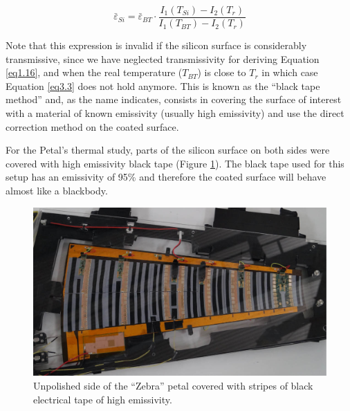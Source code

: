 		\begin{equation}\label{eq3.3}
			\bar{\varepsilon}_{Si} = \bar{\varepsilon}_{BT} \cdot \frac{I_{1}(T_{Si}) - I_{2}(T_{r})}{I_{1}(T_{BT}) - I_{2}(T_{r})}
		\end{equation}\bigskip
	
		Note that this expression is invalid if the silicon surface is considerably transmissive, since we have neglected transmissivity for deriving Equation \ref{eq1.16}, and when the real temperature ($T_{BT}$) is close to $T_{r}$ in which case Equation \ref{eq3.3} does not hold anymore. This is known as the “black tape method” and, as the name indicates, consists in covering the surface of interest with a material of known emissivity (usually high emissivity) and use the direct correction method on the coated surface.
		
		For the Petal’s thermal study, parts of the silicon surface on both sides were covered with high emissivity black tape (Figure \ref{fig3.2}). The black tape used for this setup has an emissivity of 95\% and therefore the coated surface will behave almost like a blackbody. 
	
		\begin{figure}[ht!]
			\centering
			\captionsetup{justification=centering,margin=2cm}
			\includegraphics[scale=0.40]{Figures/Chapter03/ZebraPetal.jpg}
			\caption{Unpolished side of the “Zebra” petal covered with stripes of black electrical tape of high emissivity.}\label{fig3.2}
		\end{figure}
	
